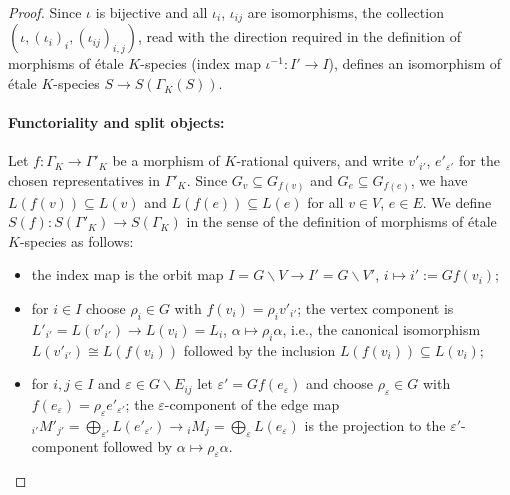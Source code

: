 \documentclass[a4paper,12pt,reqno]{amsart}
\theoremstyle{plain}
\theoremstyle{remark}
\begin{document}
\begin{proof}
    Since $\iota$ is bijective and all $\iota_i$, $\iota_{ij}$ are isomorphisms, the collection $(\iota, (\iota_i)_i, (\iota_{ij})_{i,j})$, read with the direction required in the definition of morphisms of \'etale $K$-species (index map $\iota^{-1}\colon I'\to I$), defines an isomorphism of \'etale $K$-species $S \to S(\Gamma_K(S))$.
    
    \paragraph{Functoriality and split objects:} Let $f\colon\Gamma_K\to\Gamma'_K$ be a morphism of $K$-rational quivers, and write $v'_{i'}$, $e'_{\varepsilon'}$ for the chosen representatives in $\Gamma'_K$. Since $G_v\subseteq G_{f(v)}$ and $G_e\subseteq G_{f(e)}$, we have $L(f(v))\subseteq L(v)$ and $L(f(e))\subseteq L(e)$ for all $v\in V$, $e\in E$. We define $S(f)\colon S(\Gamma'_K)\to S(\Gamma_K)$ in the sense of the definition of morphisms of \'etale $K$-species as follows:
    \begin{itemize}
      \item[(i)] the index map is the orbit map $I=G\backslash V\to I'=G\backslash V'$, $i\mapsto i':=Gf(v_i)$;
      \item[(ii)] for $i\in I$ choose $\rho_i\in G$ with $f(v_i)=\rho_iv'_{i'}$; the vertex component is $L'_{i'}=L(v'_{i'})\to L(v_i)=L_i$, $\alpha\mapsto\rho_i\alpha$, i.e., the canonical isomorphism $L(v'_{i'})\cong L(f(v_i))$ followed by the inclusion $L(f(v_i))\subseteq L(v_i)$;
      \item[(iii)] for $i,j\in I$ and $\varepsilon\in G\backslash E_{ij}$ let $\varepsilon'=Gf(e_\varepsilon)$ and choose $\rho_\varepsilon\in G$ with $f(e_\varepsilon)=\rho_\varepsilon e'_{\varepsilon'}$; the $\varepsilon$-component of the edge map ${}_{i'}M'_{j'}=\bigoplus_{\varepsilon'}L(e'_{\varepsilon'})\to{}_iM_j=\bigoplus_\varepsilon L(e_\varepsilon)$ is the projection to the $\varepsilon'$-component followed by $\alpha\mapsto\rho_\varepsilon\alpha$.
    \end{itemize}

\end{proof}
\end{document}
